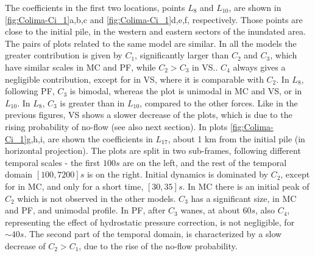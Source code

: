 \documentclass{article}
\begin{document}
The coefficients in the first two locations, points $L_8$ and $L_{10}$, are shown in \ref{fig:Colima-Ci_1}a,b,c and \ref{fig:Colima-Ci_1}d,e,f, respectively. Those points are close to the initial pile, in the western and eastern sectors of the inundated area. The pairs of plots related to the same model are similar. In all the models the greater contribution is given by $C_1$, significantly larger than $C_2$ and $C_3$, which have similar scales in MC and PF, while $C_2>C_3$ in VS.. $C_4$ always gives a negligible contribution, except for in VS, where it is comparable with $C_2$. In $L_8$, following PF, $C_3$ is bimodal, whereas the plot is unimodal in MC and VS, or in $L_{10}$. In $L_8$, $C_3$ is greater than in $L_{10}$, compared to the other forces. Like in the previous figures, VS shows a slower decrease of the plots, which is due to the rising probability of no-flow (see also next section). In plots \ref{fig:Colima-Ci_1}g,h,i, are shown the coefficients in $L_{17}$, about 1 km from the initial pile (in horizontal projection). The plots are split in two sub-frames, following different temporal scales - the first $100 s$ are on the left, and the rest of the temporal domain $[100, 7200] s$ is on the right. Initial dynamics is dominated by $C_2$, except for in MC, and only for a short time, $[30, 35] s$. In MC there is an initial peak of $C_2$ which is not observed in the other models.  $C_3$ has a significant size, in MC and PF, and unimodal profile. In PF, after $C_3$ wanes, at about $60 s$, also $C_4$, representing the effect of hydrostatic pressure correction, is not negligible, for $\sim 40 s$. The second part of the temporal domain, is characterized by a slow decrease of $C_2>C_1$, due to the rise of the no-flow probability.
\end{document}

